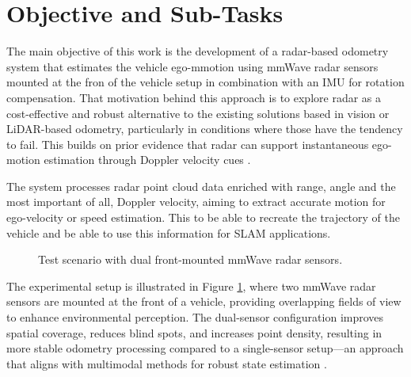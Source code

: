 \section{Objective and Sub-Tasks}
\label{sec:objective}
The main objective of this work is the development of a radar-based odometry system that estimates the vehicle ego-mmotion using mmWave radar sensors mounted at the fron of the vehicle setup in combination with an IMU for rotation compensation.
That motivation behind this approach is to explore radar as a cost-effective and robust alternative to the existing solutions based in vision or LiDAR-based odometry, particularly in conditions where those have the tendency to fail.
This builds on prior evidence that radar can support instantaneous ego-motion estimation through Doppler velocity cues \cite{EgoMotion_DopplerRadar}.

The system processes radar point cloud data enriched with range, angle and the most important of all, Doppler velocity, aiming to extract accurate motion for ego-velocity or speed estimation.
This to be able to recreate the trajectory of the vehicle and be able to use this information for SLAM applications.

\begin{figure}[!htbp]
    \centering
    \caption{Test scenario with dual front-mounted mmWave radar sensors.}
    \label{fig:test_scenario}
\end{figure}

The experimental setup is illustrated in Figure \ref{fig:test_scenario}, where two mmWave radar sensors are mounted at the front of a vehicle, providing overlapping fields of view to enhance environmental perception.
The dual-sensor configuration improves spatial coverage, reduces blind spots, and increases point density, resulting in more stable odometry processing compared to a single-sensor setup—an approach that aligns with multimodal methods for robust state estimation \cite{Multimodal_Offroad,HighSpeed_Estimation}.

